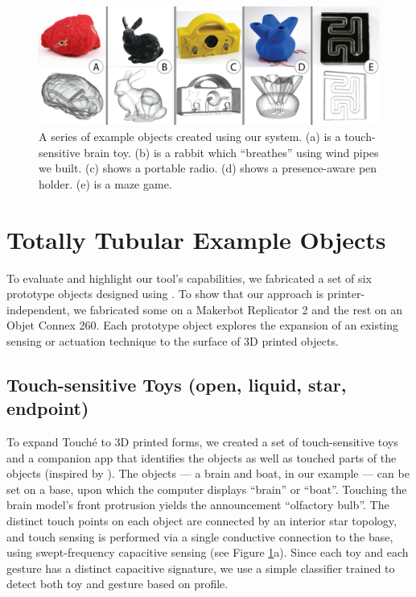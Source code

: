 \begin{figure}
\centering
    \includegraphics[width=7in]{figures/examples.png}
\caption{A series of example objects created using our system.  (a) is a touch-sensitive brain toy.  (b) is a rabbit which ``breathes'' using wind pipes we built.  (c) shows a portable radio.  (d) shows a presence-aware pen holder.  (e) is a maze game.}
\label{fig:examples}
\end{figure}

\section{Totally Tubular Example Objects}
To evaluate and highlight our tool's capabilities, we fabricated a set of six prototype objects designed using \systemnamenospace.  To show that our approach is printer-independent, we fabricated some on a Makerbot Replicator 2 and the rest on an Objet Connex 260.  Each prototype object explores the expansion of an existing sensing or actuation technique to the surface of 3D printed objects.

\subsection{Touch-sensitive Toys (open, liquid, star, endpoint)}

To expand Touch\'{e} \cite{Sato-touche} to 3D printed forms, we created a set of touch-sensitive toys and a companion app that identifies the objects as well as touched parts of the objects (inspired by \cite{Harrison-acoustic}). The objects --- a brain and boat, in our example --- can be set on a base, upon which the computer displays ``brain'' or ``boat''. Touching the brain model's front protrusion yields the announcement ``olfactory bulb''. The distinct touch points on each object are connected by an interior star topology, and touch sensing is performed via a single conductive connection to the base, using swept-frequency capacitive sensing (see Figure \ref{fig:examples}a). %
Since each toy and each gesture has a distinct capacitive signature, we use a simple classifier trained to detect both toy and gesture based on profile.

